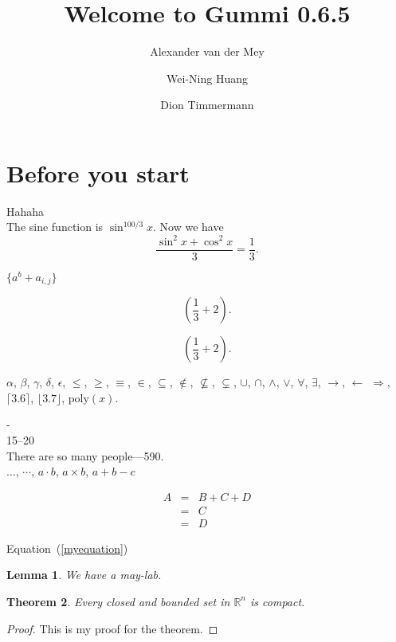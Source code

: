 \documentclass[12pt]{article}
\title{\textbf{Welcome to Gummi 0.6.5}}
\author{Alexander van der Mey \and 
		Wei-Ning Huang \and
		Dion Timmermann}
\begin{document}
\maketitle

\newtheorem{lemma}{Lemma}
\newtheorem{theorem}[lemma]{Theorem}


\section{Before you start}

Hahaha\\

The sine function is $\sin^{100/3} x$.
Now we have
\[
\frac{\sin^2 x+\cos^2 x}{3}=\frac{1}{3}.
\]

$\{a^b+a_{i,j}\}$

\[
(\frac{1}{3}+2).
\]


\[
\left(\frac{1}{3}+2\right).
\]


$\alpha$, $\beta$, $\gamma$, $\delta$, $\epsilon$,
$\leq$, $\geq$, $\equiv$, $\in$, $\subseteq$, $\notin$,
$\not\subseteq$,
$\subsetneq$, $\cup$, $\cap$, $\land$, $\lor$, $\forall$,
$\exists$,
$\rightarrow$,
$\leftarrow$
$\Rightarrow$,
$\lceil 3.6\rceil$, $\lfloor 3.7\rfloor$,
$\text{poly}(x)$.

-\\
15--20\\
There are so many people---590.\\
$\ldots$, $\cdots$, $a\cdot b$, $a\times b$, $a+b-c$

\begin{eqnarray}
A&=&B+C+D\\
&=&C\label{myequation}\\
&=&D
\end{eqnarray}

Equation~(\ref{myequation})

\begin{lemma}
We have a may-lab.
\end{lemma}

\begin{theorem}\label{mytheorem}
Every closed and bounded set in $\mathbb{R}^n$
is compact.
\end{theorem}
\begin{proof}
This is my proof for the theorem.
\end{proof}
\end{document}
